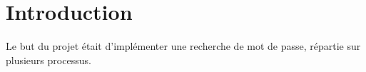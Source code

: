 \section{Introduction} %
\label{sec:introduction}
Le but du projet était d'implémenter une recherche de mot de passe, répartie sur plusieurs processus.

